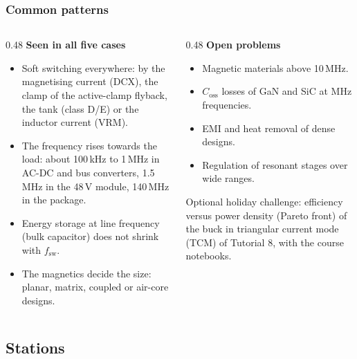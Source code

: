 \begin{frame}
	\frametitle{Common patterns}
	\begin{columns}[T]
		\begin{column}{0.48\textwidth}
			\small
			\textbf{Seen in all five cases}
			\begin{itemize}
				\item Soft switching everywhere: by the magnetising current (DCX), the clamp of the active-clamp flyback, the tank (class D/E) or the inductor current (VRM).
				\item The frequency rises towards the load: about 100\,kHz to 1\,MHz in AC-DC and bus converters, 1.5\,MHz in the 48\,V module, 140\,MHz in the package.
				\item Energy storage at line frequency (bulk capacitor) does not shrink with $f_\mathrm{sw}$.
				\item The magnetics decide the size: planar, matrix, coupled or air-core designs.
			\end{itemize}
		\end{column}
		\begin{column}{0.48\textwidth}
			\small
			\textbf{Open problems}
			\begin{itemize}
				\item Magnetic materials above 10\,MHz.
				\item $C_\mathrm{oss}$ losses of GaN and SiC at MHz frequencies.
				\item EMI and heat removal of dense designs.
				\item Regulation of resonant stages over wide ranges.
			\end{itemize}
			\vspace{0.2cm}
			Optional holiday challenge: efficiency versus power density (Pareto front) of the buck in triangular current mode (TCM) of Tutorial 8, with the course notebooks.
		\end{column}
	\end{columns}
\end{frame}

\subsection{Stations}

